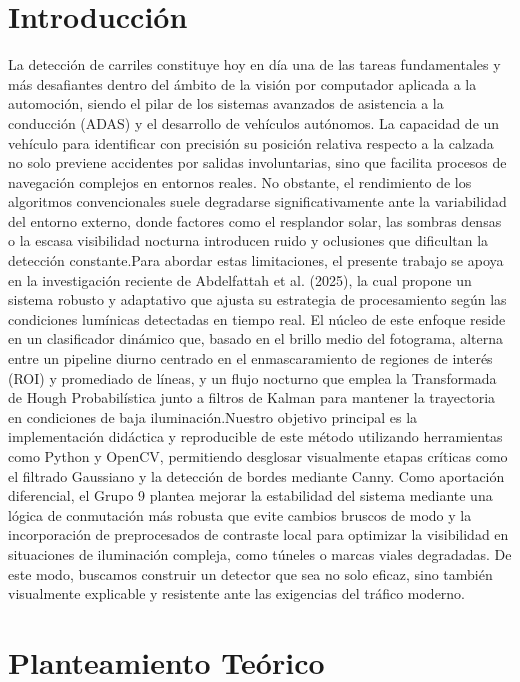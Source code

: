 \documentclass{article}
\begin{document}
\section{Introducción}
La detección de carriles constituye hoy en día una de las tareas fundamentales y más desafiantes dentro del ámbito de la visión por computador aplicada a la automoción, siendo el pilar de los sistemas avanzados de asistencia a la conducción (ADAS) y el desarrollo de vehículos autónomos. La capacidad de un vehículo para identificar con precisión su posición relativa respecto a la calzada no solo previene accidentes por salidas involuntarias, sino que facilita procesos de navegación complejos en entornos reales. No obstante, el rendimiento de los algoritmos convencionales suele degradarse significativamente ante la variabilidad del entorno externo, donde factores como el resplandor solar, las sombras densas o la escasa visibilidad nocturna introducen ruido y oclusiones que dificultan la detección constante.Para abordar estas limitaciones, el presente trabajo se apoya en la investigación reciente de Abdelfattah et al. (2025), la cual propone un sistema robusto y adaptativo que ajusta su estrategia de procesamiento según las condiciones lumínicas detectadas en tiempo real. El núcleo de este enfoque reside en un clasificador dinámico que, basado en el brillo medio del fotograma, alterna entre un pipeline diurno centrado en el enmascaramiento de regiones de interés (ROI) y promediado de líneas, y un flujo nocturno que emplea la Transformada de Hough Probabilística junto a filtros de Kalman para mantener la trayectoria en condiciones de baja iluminación.Nuestro objetivo principal es la implementación didáctica y reproducible de este método utilizando herramientas como Python y OpenCV, permitiendo desglosar visualmente etapas críticas como el filtrado Gaussiano y la detección de bordes mediante Canny. Como aportación diferencial, el Grupo 9 plantea mejorar la estabilidad del sistema mediante una lógica de conmutación más robusta que evite cambios bruscos de modo y la incorporación de preprocesados de contraste local para optimizar la visibilidad en situaciones de iluminación compleja, como túneles o marcas viales degradadas. De este modo, buscamos construir un detector que sea no solo eficaz, sino también visualmente explicable y resistente ante las exigencias del tráfico moderno.
\section{Planteamiento Teórico}
\end{document}
